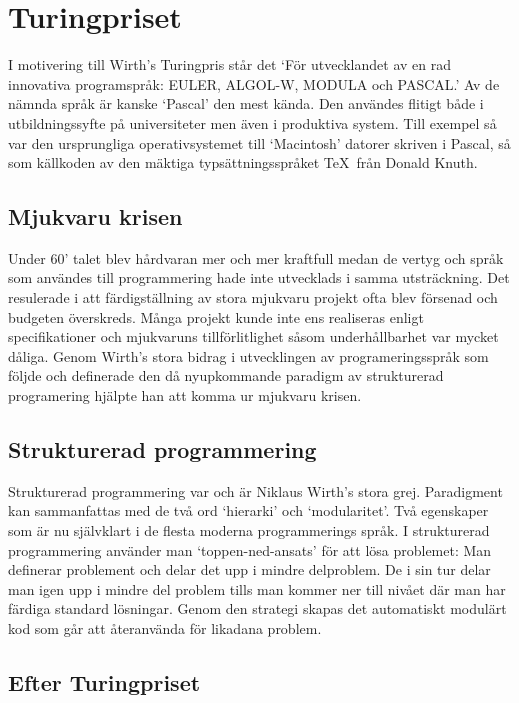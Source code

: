 \section{Turingpriset}
I motivering till Wirth's Turingpris står det `För utvecklandet av en rad 
innovativa programspråk: EULER, ALGOL-W, MODULA och PASCAL.' Av de nämnda språk 
är kanske `Pascal' den mest kända. Den användes flitigt både i utbildningssyfte 
på universiteter men även i produktiva system. Till exempel så var den ursprungliga
operativsystemet till `Macintosh' datorer skriven i Pascal, så som källkoden av
den mäktiga typsättningsspråket \TeX\ från Donald Knuth. 

\subsection{Mjukvaru krisen}
Under 60' talet blev hårdvaran mer och mer kraftfull medan de vertyg och språk som 
användes till programmering hade inte utvecklads i samma utsträckning. Det resulerade
i att färdigställning av stora mjukvaru projekt ofta blev försenad och budgeten
överskreds. Många projekt kunde inte ens realiseras enligt specifikationer 
och mjukvaruns tillförlitlighet såsom underhållbarhet var mycket
dåliga. Genom Wirth's stora bidrag i utvecklingen av programeringsspråk som följde
och definerade den då nyupkommande paradigm av strukturerad programering 
hjälpte han att komma ur mjukvaru krisen.

\subsection{Strukturerad programmering}
Strukturerad programmering var och är Niklaus Wirth's stora
grej. Paradigment kan sammanfattas med de två ord `hierarki' och
`modularitet'. Två egenskaper som är nu självklart i de flesta moderna
programmerings språk. I strukturerad programmering använder man
`toppen-ned-ansats'
för att lösa problemet: Man definerar problement och delar det upp i
mindre delproblem. De i sin tur delar man igen upp i mindre del
problem tills man kommer ner till nivået där man har färdiga standard
lösningar. Genom den strategi skapas det automatiskt modulärt kod
som går att återanvända för likadana problem.

\subsection{Efter Turingpriset}

 

